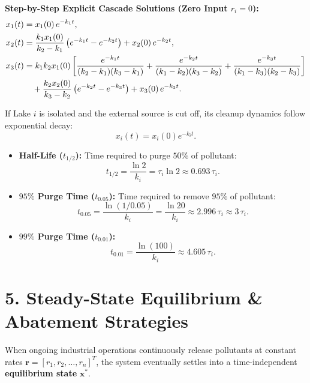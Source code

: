 \documentclass[12pt]{article}
\begin{document}
\begin{formulabox}
\textbf{Step-by-Step Explicit Cascade Solutions (Zero Input $r_i = 0$):}
\begin{align}
  x_1(t) &= x_1(0)\,e^{-k_1 t},\\
  x_2(t) &= \frac{k_1 x_1(0)}{k_2 - k_1}\left(e^{-k_1 t} - e^{-k_2 t}\right) + x_2(0)\,e^{-k_2 t},\\
  x_3(t) &= k_1 k_2 x_1(0)\left[\frac{e^{-k_1 t}}{(k_2 - k_1)(k_3 - k_1)} + \frac{e^{-k_2 t}}{(k_1 - k_2)(k_3 - k_2)} + \frac{e^{-k_3 t}}{(k_1 - k_3)(k_2 - k_3)}\right] \notag\\
  &\quad + \frac{k_2 x_2(0)}{k_3 - k_2}\left(e^{-k_2 t} - e^{-k_3 t}\right) + x_3(0)\,e^{-k_3 t}.
\end{align}
\end{formulabox}

\begin{thmbox}
If Lake $i$ is isolated and the external source is cut off, its cleanup dynamics follow exponential decay:
\begin{equation}
  x_i(t) = x_i(0) e^{-k_i t}.
\end{equation}
\begin{itemize}[itemsep=3pt]
  \item \textbf{Half-Life ($t_{1/2}$):} Time required to purge $50\%$ of pollutant:
  \[
    t_{1/2} = \frac{\ln 2}{k_i} = \tau_i \ln 2 \approx 0.693\,\tau_i.
  \]
  \item \textbf{$95\%$ Purge Time ($t_{0.05}$):} Time required to remove $95\%$ of pollutant:
  \[
    t_{0.05} = \frac{\ln(1/0.05)}{k_i} = \frac{\ln 20}{k_i} \approx 2.996\,\tau_i \approx 3\,\tau_i.
  \]
  \item \textbf{$99\%$ Purge Time ($t_{0.01}$):}
  \[
    t_{0.01} = \frac{\ln(100)}{k_i} \approx 4.605\,\tau_i.
  \]
\end{itemize}
\end{thmbox}

\vspace{10pt}

\section{5. Steady-State Equilibrium \& Abatement Strategies}

When ongoing industrial operations continuously release pollutants at constant rates $\mathbf{r} = [r_1, r_2, \dots, r_n]^T$, the system eventually settles into a time-independent \textbf{equilibrium state} $\mathbf{x}^*$.
\end{document}
